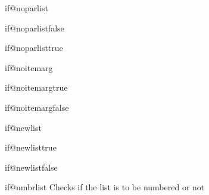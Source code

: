 \begin{teX}
\newif\if@noparitem \@noparitemfalse
\end{teX}
 

\begin{docCommand} {if@noparlist} { }
  \end{docCommand}
  
\begin{docCommand} {if@noparlistfalse}{}
\end{docCommand}

\begin{docCommand} {if@noparlisttrue}{}
\end{docCommand}  
  
\begin{teX}
\newif\if@noparlist \@noparlistfalse
\end{teX}


\begin{docCommand} {if@noitemarg} { }
\end{docCommand}

\begin{docCommand}{if@noitemargtrue}{}
\end{docCommand}  

\begin{docCommand}{if@noitemargfalse}{}
\end{docCommand}  

    \begin{teX}
\newif\if@noitemarg \@noitemargfalse
    \end{teX}


\begin{docCommand}{if@newlist}{}
\end{docCommand}

\begin{docCommand}{if@newlisttrue}{}
\end{docCommand}  

\begin{docCommand}{if@newlistfalse}{}
\end{docCommand}  

\begin{docCommand}{if@nmbrlist}{}
Checks if the list is to be numbered or not
\end{docCommand}
  
\begin{teX}
\newif\if@nmbrlist  \@nmbrlistfalse
\end{teX}




